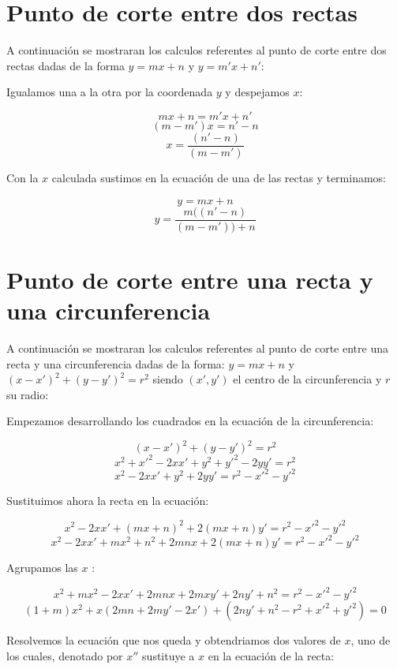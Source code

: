 
\section{Punto de corte entre dos rectas}\label{r-r}

A continuación se mostraran los calculos referentes al punto de corte entre dos rectas dadas de la forma $y = mx + n$ y $y = m'x + n'$: \par

Igualamos una a la otra por la coordenada $y$ y despejamos $x$:\par

$$mx+n = m'x+n'$$
$$(m-m')x = n'-n$$
$$x = \frac{(n'-n)}{(m-m')}$$

Con la $x$ calculada sustimos en la ecuación de una de las rectas y terminamos:\par

$$y = mx+n$$
$$y = \frac{m((n'-n)}{(m-m')) + n}$$

\section{Punto de corte entre una recta y una circunferencia}\label{r-c}

A continuación se mostraran los calculos referentes al punto de corte entre una recta y una circunferencia dadas de la forma: $y = mx + n$ y $(x-x')^2 + (y -y')^2 = r^2$ siendo $(x', y')$ el centro de la circunferencia y $r$ su radio: \par

Empezamos desarrollando los cuadrados en la ecuación de la circunferencia:\par

$$(x-x')^2 + (y -y')^2 = r^2$$
$$x^2 + x'^2 - 2xx' + y^2 + y'^2 - 2yy' = r^2$$
$$x^2 - 2xx' + y^2 + 2yy' = r^2 - x'^2 - y'^2$$

Sustituimos ahora la recta en la ecuación:\par


$$x^2 - 2xx' + (mx + n)^2 + 2(mx + n)y' = r^2 - x'^2 - y'^2$$
$$x^2 - 2xx' + mx^2 + n^2 + 2mnx + 2(mx + n)y' = r^2 - x'^2 - y'^2$$

Agrupamos las $x$ :\par


$$x^2 + mx^2 - 2xx' + 2mnx + 2mxy' + 2ny' + n^2 = r^2 - x'^2 - y'^2$$
$$(1+m)x^2 + x( 2mn + 2my' - 2x' ) + (2ny' + n^2 - r^2 + x'^2 + y'^2) = 0$$

Resolvemos la ecuación que nos queda y obtendriamos dos valores de $x$, uno de los cuales, denotado por $x''$ sustituye a $x$ en la ecuación de la recta:\par

